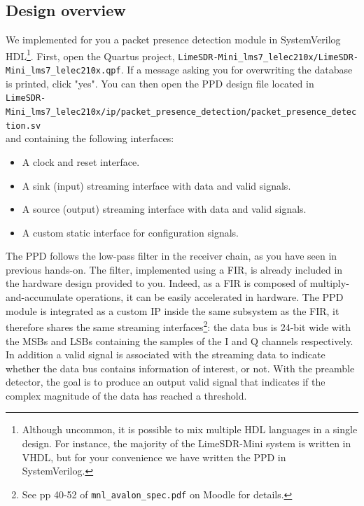 \subsection{Design overview}
We implemented for you a packet presence detection module in SystemVerilog HDL\footnote{Although uncommon, it is possible to mix multiple HDL languages in a single design. For instance, the majority of the LimeSDR-Mini system is written in VHDL, but for your convenience we have written the PPD in SystemVerilog.}. First, open the Quartus project, \texttt{LimeSDR-Mini\_lms7\_lelec210x/LimeSDR-Mini\_lms7\_lelec210x.qpf}. If a message asking you for overwriting the database is printed, click "yes". You can then open the PPD design file located in\\ \texttt{LimeSDR-Mini\_lms7\_lelec210x/ip/packet\_presence\_detection/packet\_presence\_detection.sv}\\ and containing the following interfaces:
\begin{itemize}
    \item A clock and reset interface.
    \item A sink (input) streaming interface with data and valid signals.
    \item A source (output) streaming interface with data and valid signals.
    \item A custom static interface for configuration signals.
\end{itemize}
The PPD follows the low-pass filter in the receiver chain, as you have seen in previous hands-on. The filter, implemented using a FIR, is already included in the hardware design provided to you. Indeed, as a FIR is composed of multiply-and-accumulate operations, it can be easily accelerated in hardware. The  PPD module is integrated as a custom IP inside the same subsystem as the FIR, it therefore shares the same streaming interfaces\footnote{See pp 40-52 of \texttt{mnl\_avalon\_spec.pdf} on Moodle for details.}: the data bus is 24-bit wide with the MSBs and LSBs containing the samples of the I and Q channels respectively. In addition a valid signal is associated with the streaming data to indicate whether the data bus contains information of interest, or not. With the preamble detector, the goal is to produce an output valid signal that indicates if the complex magnitude of the data has reached a threshold.

